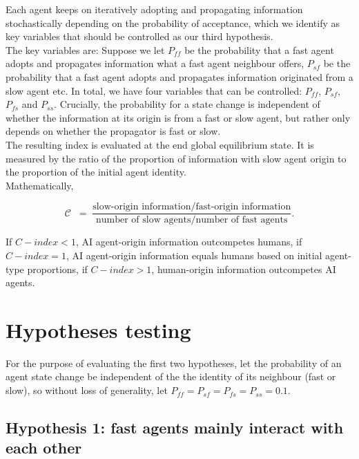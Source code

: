 \documentclass{article}
\newcommand{\Cidx}{\mathcal{C}}      %
\begin{document}
Each agent keeps on iteratively adopting and propagating information stochastically depending on the probability of acceptance, which we identify as key variables that should be controlled as our third hypothesis. \\

The key variables are: Suppose we let $P_{ff}$ be the probability that a fast agent adopts and propagates information what a fast agent neighbour offers, $P_{sf}$ be the probability that a fast agent adopts and propagates information originated from a slow agent etc. In total, we have four variables that can be controlled: $P_{ff}$, $P_{sf}$, $P_{fs}$ and $P_{ss}$. Crucially, the probability for a state change is independent of whether the information at its origin is from a fast or slow agent, but rather only depends on whether the propagator is fast or slow.\\

The resulting index is evaluated at the end global equilibrium state. It is measured by the ratio of the proportion of information with slow agent origin to the proportion of the initial agent identity. \\

Mathematically, 



\[
\Cidx \;
       \;=\; \frac{\text{slow-origin information} / \text{fast-origin information}}{\text{number of slow agents} / \text{number of fast agents}}.
\]

If $C-index < 1$, AI agent-origin information outcompetes humans, if $C-index = 1$, AI agent-origin information equals humans based on initial agent-type proportions, if $C-index > 1$, human-origin information outcompetes AI agents.

\section{Hypotheses testing}

For the purpose of evaluating the first two hypotheses, let the probability of an agent state change be independent of the the identity of its neighbour (fast or slow), so without loss of generality, let $P_{ff} = P_{sf} = P_{fs} = P_{ss} = 0.1$. \\

\subsection{Hypothesis 1: fast agents mainly interact with each other}
\end{document}
